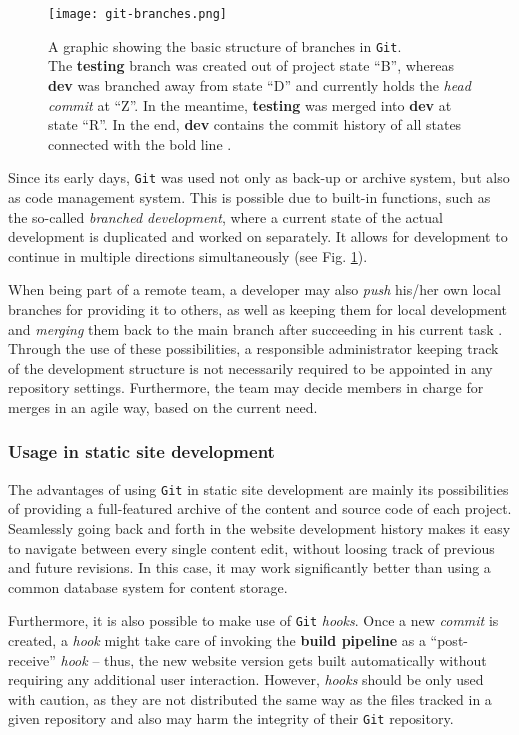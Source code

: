 \begin{figure} %
    \centering
    \texttt{[image: git-branches.png]}
    \caption{A graphic showing the basic structure of branches in \texttt{Git}.\\
    The \textbf{testing} branch was created out of project state ``B'', whereas \textbf{dev} was branched away from state ``D'' and currently holds the \emph{head commit} at ``Z''. In the meantime, \textbf{testing} was merged into \textbf{dev} at state ``R''. In the end, \textbf{dev} contains the commit history of all states connected with the bold line \cite[p. 92f]{loeliger2012version}.}
    \label{fig:git-branches}
\end{figure}
%

Since its early days, \texttt{Git} was used not only as back-up or archive system, but also as code management system. This is possible due to built-in functions, such as the so-called \emph{branched development}, where a current state of the actual development is duplicated and worked on separately. It allows for development to continue in multiple directions simultaneously \cite[89]{loeliger2012version} (see Fig. \ref{fig:git-branches}).

When being part of a remote team, a developer may also \emph{push} his/her own local branches for providing it to others, as well as keeping them for local development and \emph{merging} them back to the main branch after succeeding in his current task \cite[207]{dhillon2016}. Through the use of these possibilities, a responsible administrator keeping track of the development structure is not necessarily required to be appointed in any repository settings. Furthermore, the team may decide members in charge for merges in an agile way, based on the current need.

\subsubsection{Usage in static site development}
The advantages of using \texttt{Git} in static site development are mainly its possibilities of providing a full-featured archive of the content and source code of each project. Seamlessly going back and forth in the website development history makes it easy to navigate between every single content edit, without loosing track of previous and future revisions. In this case, it may work significantly better than using a common database system for content storage.

Furthermore, it is also possible to make use of \texttt{Git} \emph{hooks}. Once a new \emph{commit} is created, a \emph{hook} might take care of invoking the \textbf{build pipeline} as a ``post-receive'' \emph{hook} -- thus, the new website version gets built automatically without requiring any additional user interaction. However, \emph{hooks} should be only used with caution, as they are not distributed the same way as the files tracked in a given repository and also may harm the integrity of their \texttt{Git} repository.


